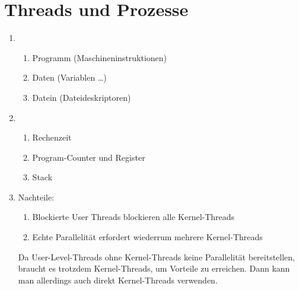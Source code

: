 \documentclass[DIN, pagenumber=false, fontsize=11pt, parskip=half]{scrartcl}
\begin{document}
    \section{Threads und Prozesse}
            \begin{enumerate}[label=(\alph*)]
                \item 
                    \begin{enumerate}
                        \item Programm (Maschineninstruktionen)
                        \item Daten (Variablen \ldots)
                        \item Datein (Dateideskriptoren)
                    \end{enumerate}
                \item
                    \begin{enumerate}
                        \item Rechenzeit
                        \item Program-Counter und Register
                        \item Stack
                    \end{enumerate}
                \item Nachteile:
                    \begin{enumerate}
                        \item Blockierte User Threads blockieren alle Kernel-Threads
                        \item Echte Parallelität erfordert wiederrum mehrere Kernel-Threads
                    \end{enumerate}
                    Da User-Level-Threads ohne Kernel-Threads keine Parallelität bereitstellen, braucht es trotzdem Kernel-Threads, um Vorteile zu erreichen. Dann kann man allerdings auch direkt Kernel-Threads verwenden.
            \end{enumerate}
\end{document}
